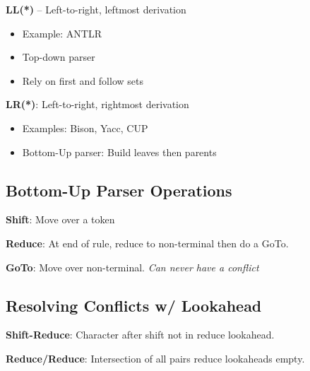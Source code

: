 \documentclass[10pt]{report}
\begin{document}
\begin{multicols}{2}
    \textbf{LL(*)} -- Left-to-right, leftmost derivation
    \begin{itemize}
      \item Example: ANTLR
      \item Top-down parser
      \item Rely on first and follow sets
    \end{itemize}
  
    \textbf{LR(*)}: Left-to-right, rightmost derivation
    \begin{itemize}
      \item Examples: Bison, Yacc, CUP 
      \item Bottom-Up parser: Build leaves then parents
    \end{itemize}
    
    \subsection{Bottom-Up Parser Operations}
    
    \textbf{Shift}: Move over a token
    
    \textbf{Reduce}: At end of rule, reduce to non-terminal then do a GoTo.
    
    \textbf{GoTo}: Move over non-terminal. \textit{Can never have a conflict}
    
    \subsection{Resolving Conflicts w/ Lookahead}
    \textbf{Shift-Reduce}: Character after shift not in reduce lookahead.
    
    \textbf{Reduce/Reduce}: Intersection of all pairs reduce lookaheads empty.
    
    
    
  \end{multicols}
\end{document}
